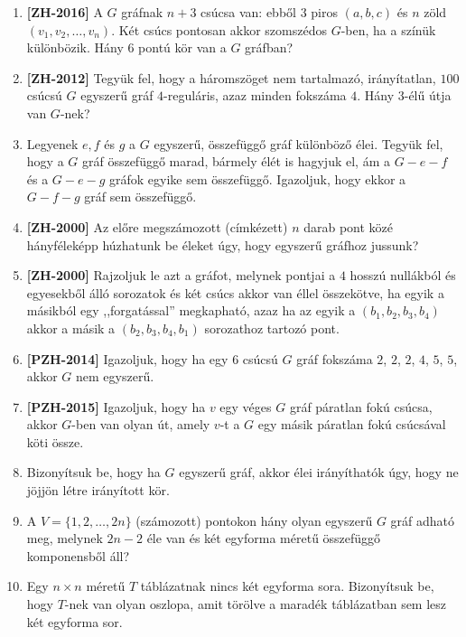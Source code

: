 \documentclass[a4paper,12pt]{article}
\begin{document}
\begin{enumerate}
        \item \textbf{[ZH-2016]} A $G$ gráfnak $n+3$ csúcsa van: ebből $3$ piros $(a, b, c)$ és $n$ zöld $(v_1, v_2, \ldots, v_n)$. Két csúcs pontosan akkor szomszédos $G$-ben, ha a színük különbözik. Hány $6$ pontú kör van a $G$ gráfban?
        
        \item \textbf{[ZH-2012]} Tegyük fel, hogy a háromszöget nem tartalmazó, irányítatlan, $100$ csúcsú $G$ egyszerű gráf $4$-reguláris, azaz minden fokszáma $4$. Hány $3$-élű útja van $G$-nek?
        
        \item Legyenek $e,f$ és $g$ a $G$ egyszerű, összefüggő gráf különböző élei. Tegyük fel, hogy a $G$ gráf összefüggő marad, bármely élét is hagyjuk el, ám a $G-e-f$ és a $G-e-g$ gráfok egyike sem összefüggő. Igazoljuk, hogy ekkor a $G-f-g$ gráf sem összefüggő.
        
        \item \textbf{[ZH-2000]} Az előre megszámozott (címkézett) $n$ darab pont közé hányféleképp húzhatunk be éleket úgy, hogy egyszerű gráfhoz jussunk?
        
        \item \textbf{[ZH-2000]} Rajzoljuk le azt a gráfot, melynek pontjai a $4$ hosszú nullákból és egyesekből álló sorozatok és két csúcs akkor van éllel összekötve, ha egyik a másikból egy ,,forgatással'' megkapható, azaz ha az egyik a $(b_1,b_2,b_3,b_4)$ akkor a másik a $(b_2,b_3,b_4,b_1)$ sorozathoz tartozó pont.

        \item \textbf{[PZH-2014]} Igazoljuk, hogy ha egy $6$ csúcsú $G$ gráf fokszáma $2$, $2$, $2$, $4$, $5$, $5$, akkor $G$ nem egyszerű.

        \item \textbf{[PZH-2015]} Igazoljuk, hogy ha $v$ egy véges $G$ gráf páratlan fokú csúcsa, akkor $G$-ben van olyan út, amely $v$-t a $G$ egy másik páratlan fokú csúcsával köti össze.

        \item Bizonyítsuk be, hogy ha $G$ egyszerű gráf, akkor élei irányíthatók úgy, hogy ne jöjjön létre irányított kör.
        
        \item A $V=\{1,2, \ldots, 2n \}$ (számozott) pontokon hány olyan egyszerű $G$ gráf adható meg, melynek $2n-2$ éle van és két egyforma méretű összefüggő komponensből áll?
        
        \item Egy $n\times n$ méretű $T$ táblázatnak nincs két egyforma sora. Bizonyítsuk be, hogy $T$-nek van olyan oszlopa, amit törölve a maradék táblázatban sem lesz két egyforma sor.

        
    \end{enumerate}
\end{document}
